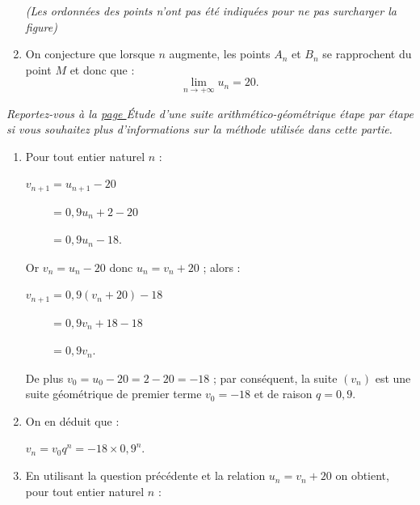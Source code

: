 \begin{corrige}
\begin{enumerate}
\begin{center}
\begin{extern}
               \end{extern}
          \end{center}
          \begin{center}
                \textit{(Les ordonnées des points n'ont pas été indiquées pour ne pas surcharger la figure)}
          \end{center}
          \item
          On conjecture que lorsque $n$ augmente, les points $A_n$ et $B_n$ se rapprochent du point $M$ et donc que :
          \[ \lim_{n \rightarrow +\infty} u_n =20. \]
          \par
     \end{enumerate}
     \par
     \par
     \textit{Reportez-vous à la \hyperlink{suite-ag-pap}{page \pageref*{suite-ag-pap}}  \og \'Etude d'une suite arithmético-géométrique étape par étape  \fg{} si vous souhaitez plus d'informations sur la méthode utilisée dans cette partie.
     }
     \par
     \begin{enumerate}
          \item %
          Pour tout entier naturel $n$ :
          \par
          $v_{n+1}=u_{n+1}-20$
          \par
          $\phantom{v_{n+1}}=0,9u_n+2-20$
          \par
          $\phantom{v_{n+1}}=0,9u_n-18$.
          \par
          Or $v_n=u_n-20$ donc $u_n=v_n+20$ ; alors :
          \par
          $v_{n+1}=0,9(v_n+20)-18$
          \par
          $\phantom{v_{n+1}}=0,9v_n+18-18$
          \par
          $\phantom{v_{n+1}}=0,9v_n$.
          \par
          De plus ${v_0=u_0-20=2-20=-18}$ ; par conséquent, la suite $(v_n)$ est une suite géométrique de premier terme ${v_0=-18}$ et de raison ${q=0,9}$.
          \item %
          On en déduit que :
          \par
          $v_n=v_0q^n=-18 \times 0,9^n$.
          \item %
          En utilisant la question précédente et la relation $u_n=v_n+20$ on obtient, pour tout entier naturel $n$ :
          \par

\end{enumerate}
\end{corrige}
